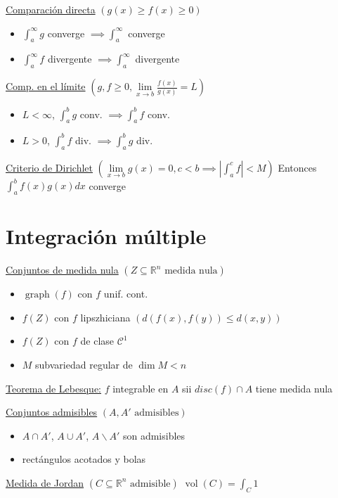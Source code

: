 \documentclass[12pt]{article}
\newcommand{\real}{\mathbb{R}}
\newcommand{\abs}[1]{\left\vert #1 \right\vert}
\DeclareMathOperator{\vol}{vol}
\DeclareMathOperator{\graph}{graph}
\begin{document}
\begin{multicols}{3}
\underline{Comparación directa} $\left( g(x) \geq f(x) \geq 0 \right)$
\begin{itemize}
	\item $\int_{a}^{\infty} g$ converge $\implies \int_{a}^{\infty}$ converge
	\item $\int_{a}^{\infty} f$ divergente $\implies \int_{a}^{\infty}$ divergente
\end{itemize}

\underline{Comp. en el límite} $\left( g, f \geq 0,
\lim\limits_{x \to b} \frac{f(x)}{g(x)} = L \right)$
\begin{itemize}
	\item $L < \infty$, $\int_{a}^{b} g$ conv. $\implies \int_{a}^{b} f$ conv.
	\item $L > 0$, $\int_{a}^{b} f$ div. $\implies \int_{a}^{b} g$ div.
\end{itemize}

\underline{Criterio de Dirichlet} $\left(\lim\limits_{x \to b} g(x) = 0,
c < b \implies \abs{\int_{a}^{c} f} < M\right)$
Entonces $\int_{a}^{b} f(x)g(x)dx$ converge

\section{Integración múltiple}

\underline{Conjuntos de medida nula} $\left( Z \subseteq \real^n \text{ medida nula} \right)$
\begin{itemize}
	\item $\graph(f)$ con $f$ unif. cont.
	\item $f(Z)$ con $f$ lipszhiciana $\left( d(f(x),f(y)) \leq d(x,y) \right)$
	\item $f(Z)$ con $f$ de clase $\mathcal{C}^1$
	\item $M$ subvariedad regular de $\dim M < n$
\end{itemize}

\underline{Teorema de Lebesque:}
$f$ integrable en $A$ sii $disc(f) \cap A$ tiene medida nula

\underline{Conjuntos admisibles} $\left( A, A' \text{ admisibles} \right)$
\begin{itemize}
	\item $A \cap A'$, $A \cup A'$, $A \smallsetminus A'$ son admisibles
	\item rectángulos acotados y bolas
\end{itemize}

\underline{Medida de Jordan} $\left( C \subseteq \real^n \text{ admisible}\right)$
$\vol(C) = \int_{C}1$


\end{multicols}
\end{document}
